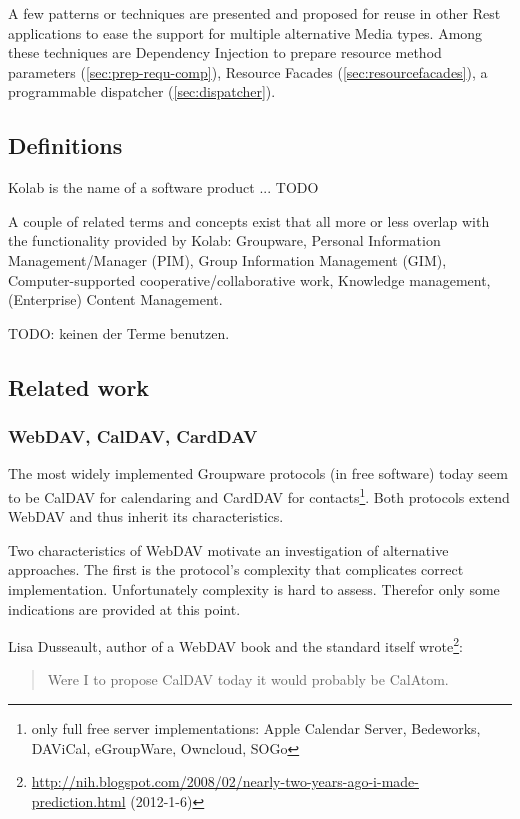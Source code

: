 \documentclass[12pt,a4paper]{scrartcl}		%
\newcommand{\citeurl}[2]{\url{#1} (#2)}
\begin{document}
A few patterns or techniques are presented and proposed for reuse in other Rest
applications to ease the support for multiple alternative Media types. Among
these techniques are Dependency Injection to prepare resource method parameters
(\autoref{sec:prep-requ-comp}), Resource Facades
  (\autoref{sec:resourcefacades}), a programmable dispatcher
  (\autoref{sec:dispatcher}).

\subsection{Definitions}

Kolab is the name of a software product ... TODO

A couple of related terms and concepts exist that all more or less overlap with
the functionality provided by Kolab: Groupware, Personal Information
Management/Manager (PIM), Group Information Management (GIM), Computer-supported
cooperative/collaborative work, Knowledge management, (Enterprise) Content
Management.

TODO: keinen der Terme benutzen.

\subsection{Related work}
\subsubsection{WebDAV, CalDAV, CardDAV}

The most widely implemented Groupware protocols (in free software) today seem to
be CalDAV\cite{RFC4791} for calendaring and CardDAV\cite{RFC6352} for
contacts\footnote{only full free server implementations: Apple Calendar Server,
  Bedeworks, DAViCal, eGroupWare, Owncloud, SOGo}. Both protocols extend
WebDAV\cite{RFC4918} and thus inherit its characteristics.

Two characteristics of WebDAV motivate an investigation of alternative
approaches. The first is the protocol's complexity that complicates correct
implementation. Unfortunately complexity is hard to assess. Therefor only some
indications are provided at this point.

Lisa Dusseault, author of a WebDAV book\cite{Dusseault2004} and the standard
itself
wrote\footnote{\citeurl{http://nih.blogspot.com/2008/02/nearly-two-years-ago-i-made-prediction.html}{2012-1-6}}:

\begin{quote}
Were I to propose CalDAV today it would probably be CalAtom.
\end{quote}
\end{document}
